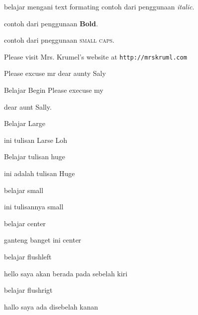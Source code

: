 \documentclass[12pt]{article}
\begin{document}
	belajar mengani text formating 
	contoh dari penggunaan \textit{italic}.
	
	contoh dari penggunaan \textbf{Bold}.
	
	contoh dari pneggunaan \textsc{small caps}.
	
	Please visit Mrs. Krumel's website at \texttt{http://mrskruml.com}
	
	Please excuse mr dear aunty Saly 
	
	Belajar Begin 
	Please execuse my \begin{large}
		dear aunt Sally.
	\end{large}
	
	Belajar Large \begin{LARGE}
		ini tulisan Larse Loh
	\end{LARGE}
	
	Belajar tulisan huge \begin{Huge}
		ini adalah tulisan Huge
	\end{Huge}
	
	belajar small \begin{small}
		ini tulisannya small	
	\end{small}	
	belajar center \begin{center}
		ganteng banget ini center
	\end{center}
	
	belajar flushleft \begin{flushleft}
		hello saya akan berada pada sebelah kiri
	\end{flushleft}
	
	belajar flushrigt \begin{flushright}
		hallo saya ada disebelah kanan
	\end{flushright}
\end{document}
